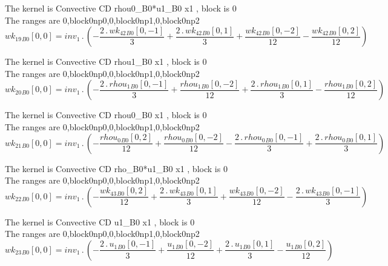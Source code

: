 \documentclass{article}
\begin{document}
\noindent The kernel is Convective CD rhou0_B0*u1_B0 x1 , block is 0\\\noindent The ranges are 0,block0np0,0,block0np1,0,block0np2\\\begin{dmath}{wk_{19}{_{B0}}}[{0,0}] = inv_1 \,.\, \left(- \frac{2 \,.\, {wk_{42}{_{B0}}}[{0,-1}]}{3} + \frac{2 \,.\, {wk_{42}{_{B0}}}[{0,1}]}{3} + \frac{{wk_{42}{_{B0}}}[{0,-2}]}{12} - \frac{{wk_{42}{_{B0}}}[{0,2}]}{12}\right)\end{dmath}

\noindent The kernel is Convective CD rhou1_B0 x1 , block is 0\\\noindent The ranges are 0,block0np0,0,block0np1,0,block0np2\\\begin{dmath}{wk_{20}{_{B0}}}[{0,0}] = inv_1 \,.\, \left(- \frac{2 \,.\, {rhou_{1}{_{B0}}}[{0,-1}]}{3} + \frac{{rhou_{1}{_{B0}}}[{0,-2}]}{12} + \frac{2 \,.\, {rhou_{1}{_{B0}}}[{0,1}]}{3} - \frac{{rhou_{1}{_{B0}}}[{0,2}]}{12}\right)\end{dmath}

\noindent The kernel is Convective CD rhou0_B0 x1 , block is 0\\\noindent The ranges are 0,block0np0,0,block0np1,0,block0np2\\\begin{dmath}{wk_{21}{_{B0}}}[{0,0}] = inv_1 \,.\, \left(- \frac{{rhou_{0}{_{B0}}}[{0,2}]}{12} + \frac{{rhou_{0}{_{B0}}}[{0,-2}]}{12} - \frac{2 \,.\, {rhou_{0}{_{B0}}}[{0,-1}]}{3} + \frac{2 \,.\, {rhou_{0}{_{B0}}}[{0,1}]}{3}\right)\end{dmath}

\noindent The kernel is Convective CD rho_B0*u1_B0 x1 , block is 0\\\noindent The ranges are 0,block0np0,0,block0np1,0,block0np2\\\begin{dmath}{wk_{22}{_{B0}}}[{0,0}] = inv_1 \,.\, \left(- \frac{{wk_{43}{_{B0}}}[{0,2}]}{12} + \frac{2 \,.\, {wk_{43}{_{B0}}}[{0,1}]}{3} + \frac{{wk_{43}{_{B0}}}[{0,-2}]}{12} - \frac{2 \,.\, {wk_{43}{_{B0}}}[{0,-1}]}{3}\right)\end{dmath}

\noindent The kernel is Convective CD u1_B0 x1 , block is 0\\\noindent The ranges are 0,block0np0,0,block0np1,0,block0np2\\\begin{dmath}{wk_{23}{_{B0}}}[{0,0}] = inv_1 \,.\, \left(- \frac{2 \,.\, {u_{1}{_{B0}}}[{0,-1}]}{3} + \frac{{u_{1}{_{B0}}}[{0,-2}]}{12} + \frac{2 \,.\, {u_{1}{_{B0}}}[{0,1}]}{3} - \frac{{u_{1}{_{B0}}}[{0,2}]}{12}\right)\end{dmath}
\end{document}
